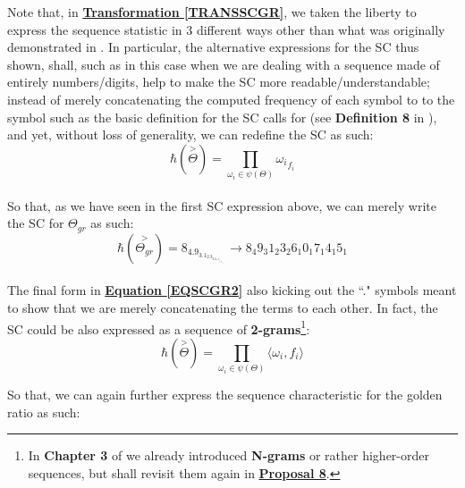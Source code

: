 \documentclass[12pt,a4paper]{article}
\begin{document}
Note that, in \textbf{\hyperref[TRANSSCGR]{Transformation \ref{TRANSSCGR}}}, we taken the liberty to express the sequence statistic in 3 different ways other than what was originally demonstrated in \cite{lutalo_2025_trans_genetics}. In particular, the alternative expressions for the SC thus shown, shall, such as in this case when we are dealing with a sequence made of entirely numbers/digits, help to make the SC more readable/understandable; instead of merely concatenating the computed frequency of each symbol to to the symbol such as the basic definition for the SC calls for (see \textbf{Definition 8} in \cite{lutalo_2025_trans_genetics}), and yet, without loss of generality, we can redefine the SC as such:\\

\begin{equation}
\label{EQSECHARDEF2}
 \hbar(\overset{>}{\Theta}) = \prod\limits_{\omega_i \in \psi(\Theta)} {\omega_i}_{f_i}
\end{equation}\\

So that, as we have seen in the first SC expression above, we can merely write the SC for $\Theta_{gr}$ as such:\\


\begin{equation}
\label{EQSCGR2}
 \hbar(\overset{>}{\Theta_{gr}}) = 8_4.9_3.1_2.3_2.6_1.0_1.7_1.4_1.5_1 \rightarrow 8_4 9_3 1_2 3_2 6_1 0_1 7_1 4_1 5_1
\end{equation}\\ 

The final form in \textbf{\hyperref[EQSCGR2]{Equation \ref{EQSCGR2}}} also kicking out the ``." symbols meant to show that we are merely concatenating the terms to each other. In fact, the SC could be also expressed as a sequence of \textbf{2-grams}\footnote{In \textbf{Chapter 3} of \cite{lutalo_2025_trans_genetics} we already introduced \textbf{N-grams} or rather higher-order sequences, but shall revisit them again in \textbf{\hyperref[PROP8]{Proposal 8}}.}:\\


\begin{equation}
\label{EQSECHARDEF3}
 \hbar(\overset{>}{\Theta}) = \prod\limits_{\omega_i \in \psi(\Theta)} \langle \omega_i, f_i \rangle
\end{equation}

So that, we can again further express the sequence characteristic for the golden ratio as such:\\
\end{document}

